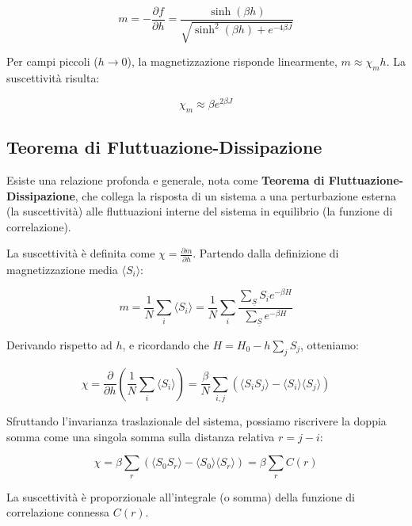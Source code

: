 \begin{equation}
m = -\frac{\partial f}{\partial h} = \frac{\sinh(\beta h)}{\sqrt{\sinh^2(\beta h) + e^{-4\beta J}}}
\end{equation}

Per campi piccoli ($h \to 0$), la magnetizzazione risponde linearmente, $m \approx \chi_m h$. La suscettività risulta:

\begin{equation}
\chi_m \approx \beta e^{2\beta J}
\end{equation}

\subsection{Teorema di Fluttuazione-Dissipazione}

Esiste una relazione profonda e generale, nota come \textbf{Teorema di Fluttuazione-Dissipazione}, che collega la risposta di un sistema a una perturbazione esterna (la suscettività) alle fluttuazioni interne del sistema in equilibrio (la funzione di correlazione).

La suscettività è definita come $\chi = \frac{\partial m}{\partial h}$. Partendo dalla definizione di magnetizzazione media $\langle S_i \rangle$:

\begin{equation}
m = \frac{1}{N}\sum_i \langle S_i \rangle = \frac{1}{N} \sum_i \frac{\sum_{\underline{S}} S_i e^{-\beta H}}{\sum_{\underline{S}} e^{-\beta H}}
\end{equation}

Derivando rispetto ad $h$, e ricordando che $H = H_0 - h \sum_j S_j$, otteniamo:

\begin{equation}
\chi = \frac{\partial}{\partial h} \left(\frac{1}{N}\sum_i \langle S_i \rangle\right) = \frac{\beta}{N}\sum_{i,j} \left( \langle S_i S_j \rangle - \langle S_i \rangle \langle S_j \rangle \right)
\end{equation}

Sfruttando l'invarianza traslazionale del sistema, possiamo riscrivere la doppia somma come una singola somma sulla distanza relativa $r = j-i$:

\begin{equation}
\chi = \beta \sum_{r} \left( \langle S_0 S_r \rangle - \langle S_0 \rangle \langle S_r \rangle \right) = \beta \sum_r C(r)
\end{equation}

La suscettività è proporzionale all'integrale (o somma) della funzione di correlazione connessa $C(r)$. 

